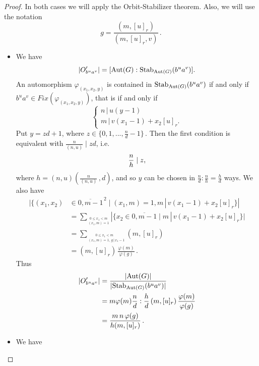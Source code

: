 \documentclass[12pt]{article}
\newcommand{\dd}{\displaystyle }
\newcommand{\0}{{\leqno}}
\def\barr{\begin{array}}
\def\earr{\end{array}}
\begin{document}
\begin{proof}
In both cases we will apply the Orbit-Stabilizer theorem. Also, we will use the notation
\begin{equation}
g=\dd\frac{(m,[u]_r)}{(m,[u]_r,v)}\,.\nonumber
\end{equation}
\begin{itemize}
\item[{\rm a)}] We have
\begin{equation}
|O'_{b^ua^v}|=[{\rm Aut}(G): {\rm Stab}_{{\rm Aut}(G)}(b^ua^v)].\nonumber
\end{equation}An automorphism $\varphi_{(x_1,x_2,y)}$ is contained in ${\rm Stab}_{{\rm Aut}(G)}(b^ua^v)$ if and only if $b^ua^v\in Fix(\varphi_{(x_1,x_2,y)})$, that is if and only if
\begin{equation}
\left\{\barr{lll}
\!\!n\,|\,u(y-1)\\
\!\!m\,|\,v(x_1-1)+x_2[u]_r.\earr\right.\nonumber
\end{equation}Put $y=zd+1$, where $z\in\{0,1,...,\frac{n}{d}-1\}$\,. Then the first condition is equivalent with $\frac{n}{(n,u)}\mid zd$, i.e.\vspace{-2mm} \begin{equation}
\dd\frac{n}{h}\mid z,\vspace{-2mm}\nonumber 
\end{equation}where $h=(n,u)\left(\frac{n}{(n,u)}\,,d\right)$, and so $y$ can be chosen in $\frac{n}{d}:\frac{n}{h}=\frac{h}{d}$ ways. We also have
\begin{align*}
|\{(x_1,x_2)&\in\overline{0,m-1}^{\,2}\mid (x_1,m)=1, m\,|\,v(x_1-1)+x_2[u]_r\}|\\
&=\dd\sum_{^{\,\,\,\,0\leq x_1<m}_{\ (x_1,m)=1}}|\{x_2\in\overline{0,m-1}\mid m\,|\,v(x_1-1)+x_2[u]_r\}|\\
&=\!\!\!\dd\sum_{^{\,\,\,\,\,\,\,\,\,\,\,\,\,\,0\leq x_1<m}_{\ (x_1,m)=1,\, g\,|\,x_1-1}}\!\!\!\!\!(m,[u]_r)\\
&=(m,[u]_r)\,\dd\frac{\varphi(m)}{\varphi(g)}\,.
\end{align*}Thus
\begin{align*}
|O'_{b^ua^v}|&=\dd\frac{|{\rm Aut}(G)|}{|{\rm Stab}_{{\rm Aut}(G)}(b^ua^v)|}\\
&=m\varphi(m)\frac{n}{d}: \dd\frac{h}{d}\,(m,[u]_r)\,\dd\frac{\varphi(m)}{\varphi(g)}\\
&=\dd\frac{m\,n\,\varphi(g)}{h(m,[u]_r)}\,.
\end{align*}
\item[{\rm b)}] We have\vspace{-1mm}

\end{itemize}
\end{proof}
\end{document}

